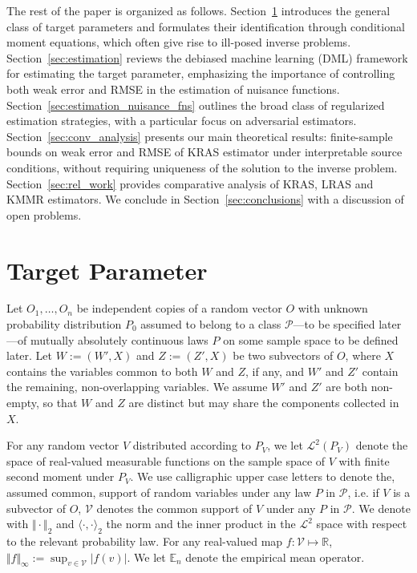\documentclass[twoside,11pt]{article}
\newcommand{\mc}{\mathcal}
\begin{document}
The rest of the paper is organized as follows. Section~\ref{sec:targer_param} introduces the general class of target parameters and formulates their identification through conditional moment equations, which often give rise to ill-posed inverse problems. Section~\ref{sec:estimation} reviews the debiased machine learning (DML) framework for estimating the target parameter, emphasizing the importance of controlling both weak error and RMSE in the estimation of nuisance functions. Section~\ref{sec:estimation_nuisance_fns} outlines the broad class of regularized estimation strategies, with a particular focus on adversarial estimators. Section~\ref{sec:conv_analysis} presents our main theoretical results: finite-sample bounds on weak error and RMSE of KRAS estimator under interpretable source conditions, without requiring uniqueness of the solution to the inverse problem. Section~\ref{sec:rel_work} provides comparative analysis of KRAS, LRAS and KMMR estimators. We conclude in Section~\ref{sec:conclusions} with a discussion of open problems.


\section{Target Parameter}\label{sec:targer_param}

Let $O_1, \dots, O_n$ be independent copies of a random vector $O$ with unknown probability distribution $P_0$  assumed to belong to a class $\mc{P}$---to be specified later---of mutually absolutely continuous laws $P$ on some sample space to be defined later. Let $W:=(W', X)$ and $Z:=(Z',X)$ be two subvectors of $O$, where $X$ contains the variables common to both $W$ and $Z$, if any, and $W'$ and $Z'$ contain the remaining, non-overlapping variables. We assume $W'$ and $Z'$ are both non-empty, so that $W$ and $Z$ are distinct but may share the components collected in $X$.

For any random vector $V$ distributed according to $P_V$, we let $\mc{L}^2(P_V)$ denote the space of real-valued measurable functions on the sample space of $V$ with finite second moment under $P_V$. We use calligraphic upper case letters to denote the, assumed common, support of random variables under any law $P$ in $\mc{P}$, i.e. if $V$ is a subvector of $O$, $\mc{V}$ denotes the common support of $V$ under any $P$ in $\mc{P}$. We denote with $\Vert\cdot\Vert_2$
and $\langle\cdot,\cdot\rangle_2$ the norm and the inner product in the $\mc{L}^2$ space with respect to the relevant probability law. For any real-valued map $f :\mc{V}\mapsto \mathbb{R}$, $\Vert f\Vert_\infty:=\sup_{v\in\mc{V}}|f(v)|$. We let $\mathbb{E}_n$ denote the empirical mean operator.
\end{document}
